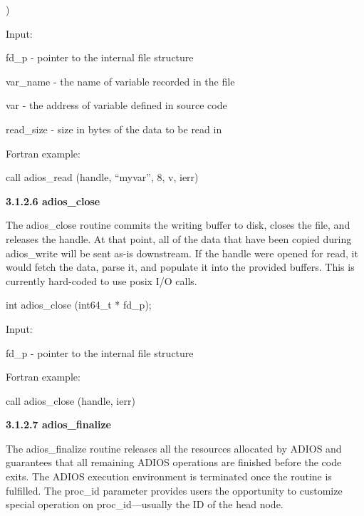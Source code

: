 \vspace{10pt}
)

\vspace{10pt}
\leftskip=22pt
\parindent=0pt
Input:

\vspace{10pt}
fd\_p - pointer to the internal file structure

\vspace{10pt}
var\_name - the name of variable recorded in the file

\vspace{10pt}
var - the address of variable defined in source code

\vspace{10pt}
read\_size -  size in bytes of the data to be read in 

\vspace{22pt}
\leftskip=22pt
Fortran example: 

\vspace{10pt}
\parindent=18pt
call adios\_read (handle, ``myvar'', 8, v, ierr)

\vspace{22pt}
\leftskip=0pt
\parindent=0pt
\textbf{3.1.2.6 adios\_close}

\vspace{10pt}
The adios\_close routine {\color{color01} commits the writing buffer to disk, closes 
the file, and releases the handle. At that point, all of the data that have been 
copied during adios\_write will be sent as-is downstream. If the handle were opened 
for read, it would fetch the data, parse it, and populate it into the provided 
buffers. This is currently hard-coded to use posix I/O calls.}

\vspace{10pt}
\leftskip=22pt
int adios\_close (int64\_t * fd\_p);

\vspace{10pt}
Input: 

\vspace{10pt}
fd\_p - pointer to the internal file structure

\vspace{22pt}
\leftskip=22pt
Fortran example: 

\vspace{10pt}
\leftskip=22pt
call adios\_close (handle, ierr)

\vspace{10pt}
\leftskip=0pt
\textbf{3.1.2.7 adios\_finalize}

\vspace{10pt}
The adios\_finalize routine releases all the resources allocated by ADIOS and guarantees 
that all remaining ADIOS operations are finished before the code exits. The ADIOS 
execution environment is terminated once the routine is fulfilled. The proc\_id 
parameter provides users the opportunity to customize special operation on proc\_id---usually 
the ID of the head node. 

